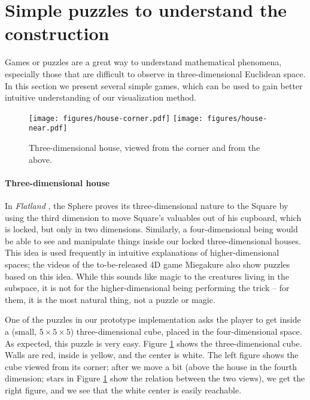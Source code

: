 \documentclass{article}
\begin{document}

\section{Simple puzzles to understand the construction}
Games or puzzles are a great way to understand mathematical phenomena, especially those that are difficult to observe in three-dimensional
Euclidean space. In this section we present several simple games, which can be used to gain better intuitive understanding of
our visualization method.

\begin{figure}
\texttt{[image: figures/house-corner.pdf]} \hskip -1mm
\texttt{[image: figures/house-near.pdf]}
\caption{Three-dimensional house, viewed from the corner and from the above.\label{house3}}
\end{figure}

\paragraph{Three-dimensional house} In {\it Flatland} \cite{flatland}, the Sphere proves its three-dimensional nature to the 
Square by using the third dimension to move Square's valuables out of his cupboard, which is locked, but only in two dimensions.
Similarly, a four-dimensional being would be able to see and manipulate things inside our locked three-dimensional houses.
This idea is used frequently in intuitive explanations of higher-dimensional spaces; the videos of the to-be-released 4D game
Miegakure \cite{miegakure} also show puzzles based on this idea. While this sounds like magic to the creatures living in the 
subspace, it is not for the higher-dimensional being performing the trick -- for them, it is the most natural thing, not a puzzle
or magic.

One of the puzzles in our prototype implementation asks the player to get inside a (small, $5\times 5\times 5$) three-dimensional cube,
placed in the four-dimensional space. As expected, this puzzle is very easy. Figure \ref{house3} shows the 
three-dimensional cube. Walls are red, inside is yellow, and the center is white. The left figure shows the cube viewed from its corner;
after we move a bit (above the house in the fourth dimension; stars in Figure \ref{house3} show the relation between the two views),
we get the right figure, and we see that the white center is easily reachable.
\end{document}
